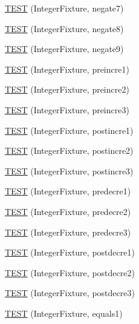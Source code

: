 \begin{DoxyCompactItemize}
\item 
\hyperlink{temp_test_integer_8c_09_09_a7d3356c408dd32d46bc3400907aa2c45}{T\-E\-S\-T} (Integer\-Fixture, negate7)
\item 
\hyperlink{temp_test_integer_8c_09_09_ae65e6b7bb37558da7aeedb312f8c90e6}{T\-E\-S\-T} (Integer\-Fixture, negate8)
\item 
\hyperlink{temp_test_integer_8c_09_09_a6606563c740df8229b8988a0e3346367}{T\-E\-S\-T} (Integer\-Fixture, negate9)
\item 
\hyperlink{temp_test_integer_8c_09_09_a1f411d2ecb4bbe7bd8e3268414fa3dc4}{T\-E\-S\-T} (Integer\-Fixture, preincre1)
\item 
\hyperlink{temp_test_integer_8c_09_09_adfc83751099bbc9145926ba054a8c453}{T\-E\-S\-T} (Integer\-Fixture, preincre2)
\item 
\hyperlink{temp_test_integer_8c_09_09_a607e96817960ad36ec733c7b434545cb}{T\-E\-S\-T} (Integer\-Fixture, preincre3)
\item 
\hyperlink{temp_test_integer_8c_09_09_a0bce5ae03cef7d2b19d25c00f9b560bc}{T\-E\-S\-T} (Integer\-Fixture, postincre1)
\item 
\hyperlink{temp_test_integer_8c_09_09_afa91fad76d9e16f540f9020f94b3d0ff}{T\-E\-S\-T} (Integer\-Fixture, postincre2)
\item 
\hyperlink{temp_test_integer_8c_09_09_aebfdb0ec2a3c8ef3a9b51d566a0977fe}{T\-E\-S\-T} (Integer\-Fixture, postincre3)
\item 
\hyperlink{temp_test_integer_8c_09_09_a52f8ef4525309c8c25d5e8f15ca248fa}{T\-E\-S\-T} (Integer\-Fixture, predecre1)
\item 
\hyperlink{temp_test_integer_8c_09_09_a93618a456d9df7d3cc8d5fd437ff0ebe}{T\-E\-S\-T} (Integer\-Fixture, predecre2)
\item 
\hyperlink{temp_test_integer_8c_09_09_a8f38c4c615ca619567542d2c37e25c8d}{T\-E\-S\-T} (Integer\-Fixture, predecre3)
\item 
\hyperlink{temp_test_integer_8c_09_09_adf469567531cb9fa3a037598936bf0e3}{T\-E\-S\-T} (Integer\-Fixture, postdecre1)
\item 
\hyperlink{temp_test_integer_8c_09_09_a489040d9f34489502fc159950ee4c22b}{T\-E\-S\-T} (Integer\-Fixture, postdecre2)
\item 
\hyperlink{temp_test_integer_8c_09_09_a5e5bd8e1a2178f726f13b3eb481d1070}{T\-E\-S\-T} (Integer\-Fixture, postdecre3)
\item 
\hyperlink{temp_test_integer_8c_09_09_af49f1526a846a2abaecb1266a2aa53d5}{T\-E\-S\-T} (Integer\-Fixture, equals1)
\item 

\end{DoxyCompactItemize}
